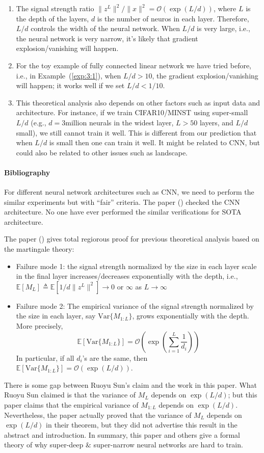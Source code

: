 \begin{remark}
\begin{enumerate}
\item
The signal strength ratio $\|z^L\|^2/\|x\|^2=\mathcal{O}(\exp(L/d))$,
where $L$ is the depth of the layers, $d$ is the number of neuros in each layer. 
Therefore, $L/d$ controls the width of the neural network.
When $L/d$ is very large, i.e., the neural network is very narrow, it's likely that gradient explosion/vanishing will happen.
\item
For the toy example of fully connected linear network we have tried before, i.e., in Example~(\ref{exp:3:1}), when $L/d>10$, the gradient explosion/vanishing will happen;
it works well if we set $L/d<1/10$. 
\item
This theoretical analysis also depends on other factors such as input data and architecture. For instance, if we train CIFAR10/MINST using super-small $L/d$ 
(e.g., $d=3\text{million}$ neurals in the widest layer, $L>50$ layers, and $L/d$ small),
we still cannot train it well.
This is different from our prediction that when $L/d$ is small then one can train it well. It might be related to CNN, but could also be related to other issues such as landscape.
\end{enumerate}
\end{remark}
\paragraph{Bibliography}
For different neural network architectures such as CNN, we need to perform the similar experiments but with ``fair'' criteria. The paper (\cite{Glorot10understandingthe}) checked the CNN architecture. 
No one have ever performed the similar verifications for SOTA architecture.

The paper (\cite{NIPS2018_7338}) gives total regiorous proof for previous theoretical analysis based on the martingale theory:
\begin{itemize}
\item
Failure mode 1:
the signal strength normalized by the size in each layer
scale in the final layer increases/decreases exponentially with the depth,
i.e.,
$\mathbb{E}[M_L]\triangleq\mathbb{E}[1/d\|z^L\|^2]\to0$ or $\infty$ as $L\to\infty$
\item
Failure mode 2: The empirical variance of the signal strength normalized by the size in each layer, say $\text{Var}\{M_{1:L}\}$, grows exponentially with the depth. More precisely,
\[
\mathbb{E}\left[\text{Var}\{M_{1:L}\}\right]=\mathcal{O}\left(
\exp\left(\sum_{i=1}^L\frac{1}{d_i}\right)\right)
\]
In particular, if all $d_i$'s are the same, then $\mathbb{E}\left[\text{Var}\{M_{1:L}\}\right]=\mathcal{O}(\exp(L/d))$.
\end{itemize}
There is some gap between Ruoyu Sun's claim and the work in this paper. What Ruoyu Sun claimed is that the variance of $M_L$ depends on $\exp(L/d)$;
but this paper claims that the empirical variance of $M_{1:L}$ depends on $\exp(L/d)$.
Nevertheless, the paper actually proved that the variance of $M_L$ depends on $\exp(L/d)$ in their theorem, but they did not advertise this result in the abstract and introduction.
In summary, this paper and others give a formal theory of why super-deep $\&$ super-narrow neural networks are hard to train.
